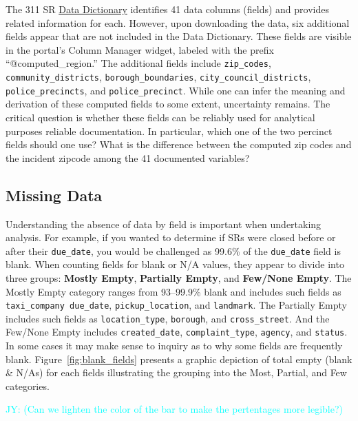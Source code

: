 \documentclass[linenumber]{jdsart}
\newcommand{\jy}[1]{\textcolor{cyan}{JY: (#1)}}
\begin{document}
The 311 SR 
\href{https://data.cityofnewyork.us/api/views/erm2-nwe9/files/b372b884-f86a-453b-ba16-1fe06ce9d212?download=true&filename=311_ServiceRequest_2010-Present_DataDictionary_Updated_2023.xlsx}{Data Dictionary} 
identifies 41 data columns (fields) and provides related information 
for each. However, upon downloading the data, six additional fields 
appear that are not included in the Data Dictionary. These fields are 
visible in the portal's Column Manager widget, labeled with the prefix 
``@computed\_region.'' The additional fields include \texttt{zip\_codes}, 
\texttt{community\_districts}, \texttt{borough\_boundaries}, 
\texttt{city\_council\_districts}, \texttt{police\_precincts}, and 
\texttt{police\_precinct}. While one can infer the meaning and 
derivation of these computed fields to some extent, uncertainty remains. 
The critical question is whether these fields can be reliably used for 
analytical purposes reliable documentation. In particular, which one
of the two percinct fields should one use? What is the difference
between the computed zip codes and the incident zipcode among the 41
documented variables?


\subsection{Missing Data}
\label{sec:blanks}
Understanding the absence of data by field is important 
when undertaking analysis. For example, if you wanted to 
determine if SRs were closed before or after their
\texttt{due\_date}, you would be challenged as 99.6\% of the
\texttt{due\_date} field is
blank. When counting fields for blank or N/A values, they appear 
to divide into three groups:
\textbf{Mostly Empty}, \textbf{Partially Empty}, 
and \textbf{Few/None Empty}. 
The Mostly Empty category ranges from 93--99.9\% blank 
and includes such fields as
\texttt{taxi\_company due\_date},
\texttt{pickup\_location}, and \texttt{landmark}.
The Partially Empty includes such fields as
\texttt{location\_type}, \texttt{borough}, 
and \texttt{cross\_street}. And the Few/None Empty includes
\texttt{created\_date}, \texttt{complaint\_type},
\texttt{agency}, and \texttt{status}. In some cases it may make
sense to inquiry as to why some fields are frequently blank.
Figure~\ref{fig:blank_fields} presents a graphic 
depiction of total empty (blank \& N/As) for each fields illustrating
the grouping into the Most, Partial, and Few categories.

\jy{Can we lighten the color of the bar to make the pertentages more
  legible?}
\end{document}
